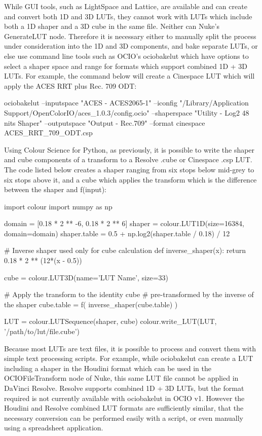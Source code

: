 While GUI tools, such as LightSpace and Lattice, are available and can create and convert both 1D and 3D LUTs, they cannot work with LUTs which include both a 1D shaper and a 3D cube in the same file. Neither can Nuke’s GenerateLUT node. Therefore it is necessary either to manually split the process under consideration into the 1D and 3D components, and bake separate LUTs, or else use command line tools such as OCIO’s ociobakelut which have options to select a shaper space and range for formats which support combined 1D + 3D LUTs. For example, the command below will create a Cinespace LUT which will apply the ACES RRT plus Rec. 709 ODT:

ociobakelut --inputspace "ACES - ACES2065-1" --iconfig "/Library/Application Support/OpenColorIO/aces_1.0.3/config.ocio" --shaperspace "Utility - Log2 48 nits Shaper" --outputspace "Output - Rec.709" --format cinespace ACES_RRT_709_ODT.csp

Using Colour Science for Python, as previously, it is possible to write the shaper and cube components of a transform to a Resolve .cube or Cinespace .csp LUT. The code listed below creates a shaper ranging from six stops below mid-grey to six stops above it, and a cube which applies the transform which is the difference between the shaper and f(input):

import colour
import numpy as np

domain = [0.18 * 2 ** -6, 0.18 * 2 ** 6]
shaper = colour.LUT1D(size=16384, domain=domain)
shaper.table = 0.5 + np.log2(shaper.table / 0.18) / 12

# Inverse shaper used only for cube calculation
def inverse_shaper(x):
    return 0.18 * 2 ** (12*(x - 0.5))

cube = colour.LUT3D(name='LUT Name', size=33)

# Apply the transform to the identity cube
# pre-transformed by the inverse of the shaper
cube.table = f( inverse_shaper(cube.table) )

LUT = colour.LUTSequence(shaper, cube)
colour.write_LUT(LUT, '/path/to/lut/file.cube')

Because most LUTs are text files, it is possible to process and convert them with simple text processing scripts. For example, while ociobakelut can create a LUT including a shaper in the Houdini format which can be used in the OCIOFileTransform node of Nuke, this same LUT file cannot be applied in DaVinci Resolve. Resolve supports combined 1D + 3D LUTs, but the format required is not currently available with ociobakelut in OCIO v1. However the Houdini and Resolve combined LUT formats are sufficiently similar, that the necessary conversion can be performed easily with a script, or even manually using a spreadsheet application.


